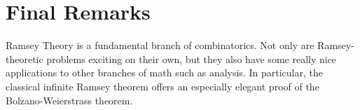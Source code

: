 \section{Final Remarks}
Ramsey Theory is a fundamental branch of combinatorics. Not only are Ramsey-theoretic problems exciting on their own, but they also have some really nice applications to other branches of math such as analysis. In particular, the classical infinite Ramsey theorem offers an especially elegant proof of the Bolzano-Weierstrass theorem.
